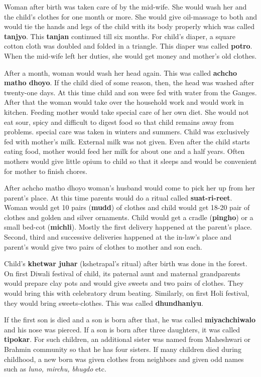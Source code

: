 Woman after birth was taken care of by the mid-wife. She would wash her and
the child's clothes for one month or more. She would give oil-massage to both
and would tie the hands and legs of the child with its body properly which was
called \textbf{tanjyo}. This \textbf{tanjan} continued till six months. For
child's diaper, a square cotton cloth was doubled and folded in a triangle.
This diaper was called \textbf{potro}. When the mid-wife left her duties, she
would get money and mother's old clothes.

After a month, woman would wash her head again. This was called \textbf{achcho
matho dhoyo}. If the child died of some reason, then, the head was washed after
twenty-one days. At this time child and son were fed with water from the
Ganges. After that the woman would take over the household work and would work
in kitchen. Feeding mother would take special care of her own diet. She would
not eat sour, spicy and difficult to digest food so that child remains away
from problems. special care was taken in winters and summers. Child was
exclusively fed with mother's milk. External milk was not given. Even after the
child starts eating food, mother would feed her milk for about one and a half
years. Often mothers would give little opium to child so that it sleeps and
would be convenient for mother to finish chores.

After achcho matho dhoyo woman's husband would come to pick her up from her
parent's place. At this time parents would do a ritual called
\textbf{suat-ri-reet}. Woman would get 10 pairs (\textbf{mudd}) of clothes and
child would get 18-20 pair of clothes and golden and silver ornaments. Child
would get a cradle (\textbf{pingho}) or a small bed-cot (\textbf{michli}).
Mostly the first delivery happened at the parent's place. Second, third and
successive deliveries happened at the in-law's place and parent's would give
two pairs of clothes to mother and son each.

Child's \textbf{khetwar juhar} (kshetrapal's ritual) after birth was done in
the forest. On first Diwali festival of child, its paternal aunt and maternal
grandparents would prepare clay pots and would give sweets and two pairs of
clothes. They would bring this with celebratory drum beating. Similarly, on
first Holi festival, they would bring sweets-clothes. This was called
\textbf{dhundhaniyu}.

If the first son is died and a son is born after that, he was called
\textbf{miyachchiwalo} and his nose was pierced. If a son is born after three
daughters, it was called \textbf{tipokar}. For such children, an additional
sister was named from Maheshwari or Brahmin community so that he has four
sisters. If many children died during childhood, a new born was given clothes
from neighbors and given odd names such as \textit{luno, mirchu, bhugdo} etc.

